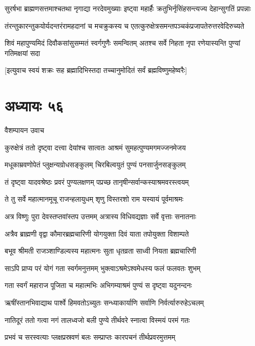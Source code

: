\twolineshloka
{सुरर्षभा ब्राह्मणसत्तमाश्चतथा नृगाद्या नरदेवमुख्याः}
{इष्ट्वा महार्हैः क्रतुभिर्नृसिंहसन्त्यज्य देहान्सुगतिं प्रपन्नाः}


\twolineshloka
{तंरन्तुकारन्तुकयोर्यदन्तरंरामहदानां च मचक्रुकस्य च}
{एतत्कुरुक्षेत्रसमन्तपञ्चकंप्रजापतेरुत्तरवेदिरुच्यते}


\twolineshloka
{शिवं महापुण्यमिदं दिवौकसांसुसम्मतं स्वर्गगुणैः समन्वितम्}
{अतश्च सर्वे निहता नृपा रणेयास्यन्ति पुण्यां गतिमक्षयां सदा}


\twolineshloka
{[इत्युवाच स्वयं शक्रः सह ब्रह्मादिभिस्तदा}
{तच्चानुमोदितं सर्वं ब्रह्मविष्णुमहेष्वरैः]}


\chapter{अध्यायः ५६}
\twolineshloka
{वैशम्पायन उवाच}
{}


\twolineshloka
{कुरुक्षेत्रं ततो दृष्ट्वा दत्त्वा देयांश्च सात्वतः}
{आश्रमं सुमहत्पुण्यमगमज्जनमेजय}


\twolineshloka
{मधूकाम्रवणोपेतं प्लुक्षन्यग्रोधसङ्कुलम्}
{चिरबिल्वयुतं पुण्यं पनसार्जुनसङ्कुलम्}


\twolineshloka
{तं दृष्ट्वा यादवश्रेष्ठः प्रवरं पुण्यलक्षणम्}
{पप्रच्छ तानृषीन्सर्वान्कस्याश्रमवरस्त्वयम्}


\twolineshloka
{ते तु सर्वे महात्मानमूचू राजन्हलायुधम्}
{शृणु विस्तरशो राम यस्यायं पूर्वमाश्रमः}


\twolineshloka
{अत्र विष्णुः पुरा देवस्तप्तवांस्तप उत्तमम्}
{अत्रास्य विधिवद्यज्ञाः सर्वे वृत्ताः सनातनाः}


\twolineshloka
{अत्रैव ब्राह्मणी वृद्वा कौमारब्रह्मचारिणी}
{योगयुक्ता दिवं याता तपोयुक्ता विशाम्पते}


\twolineshloka
{बभूव श्रीमती राजञ्शाण्डिल्यस्य महात्मनः}
{सुता धृतव्रता साध्वी नियता ब्रह्मचारिणी}


\twolineshloka
{साऽपि प्राप्य परं योगं गता स्वर्गमनुत्तमम्}
{भुक्त्वाऽश्रमेऽश्वमेधस्य फलं फलवतः शुभम्}


\twolineshloka
{गता स्वर्गं महाराज पूजिता च महात्मभिः}
{अभिगम्याश्रमं पुण्यं स दृष्ट्वा यदुनन्दनः}


\twolineshloka
{ऋषींस्तानभिवाद्याथ पार्श्वे हिमवतोऽच्युतः}
{सन्ध्याकार्याणि सर्वाणि निर्वर्त्यारुरुहेऽचलम्}


\twolineshloka
{नातिदूरं ततो गत्वा नगं तालध्वजो बली}
{पुण्ये तीर्थवरे स्नात्वा विस्मयं परमं गतः}


\twolineshloka
{प्रभवं च सरस्वत्याः प्लक्षप्रस्रवणं बलः}
{सम्प्राप्तः कारपचनं तीर्थप्रवरमुत्तमम्}



